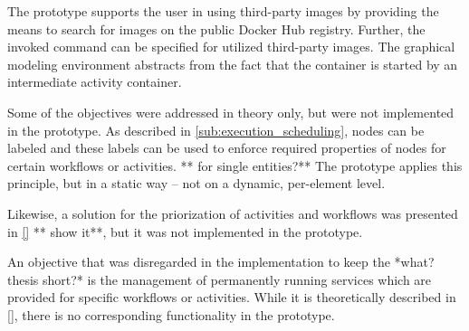   The prototype supports the user in using third-party images by providing the means to search for images on the public Docker Hub registry. Further, the invoked command can be specified for utilized third-party images. The graphical modeling environment abstracts from the fact that the container is started by an intermediate activity container.


  Some of the objectives were addressed in theory only, but were not implemented in the prototype.
  As described in \ref{sub:execution_scheduling}, nodes can be labeled and these labels can be used to enforce required properties of nodes for certain workflows or activities. ** for single entities?**
  The prototype applies this principle, but in a static way -- not on a dynamic, per-element level.

  Likewise, a solution for the priorization of activities and workflows was presented in \ref{} ** show it**, but it was not implemented in the prototype.

  An objective that was disregarded in the implementation to keep the *what? thesis short?* is the management of permanently running services which are provided for specific workflows or activities. While it is theoretically described in \ref{}, there is no corresponding functionality in the prototype.
